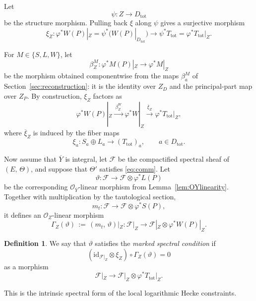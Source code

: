 \documentclass[a4paper,12pt]{amsart}
\numberwithin{equation}{section}
\theoremstyle{definition}
\newtheorem{definition}[theorem]{Definition}
\newcommand{\OO}{\mathcal{O}}
\newcommand{\cF}{\mathcal{F}}
\newcommand{\id}{\mathrm{id}}
\begin{document}
Let
\[
\psi:Z\longrightarrow D_{\mathrm{tot}}
\]
be the structure morphism.  Pulling back \(\xi\) along \(\psi\) gives a surjective morphism
\begin{equation}\label{eq:xiZ}
\xi_Z:\varphi^*W(P)|_Z=\psi^*\bigl(W(P)|_{D_{\mathrm{tot}}}\bigr)
\longrightarrow
\psi^*T_{\mathrm{tot}}=\varphi^*T_{\mathrm{tot}}|_Z .
\end{equation}

For \(M\in\{S,L,W\}\), let
\[
\beta_Z^M:\varphi^*M(P)|_Z\longrightarrow \varphi^*M|_Z
\]
be the morphism obtained componentwise from the maps \(\beta_a^M\) of Section~\ref{sec:reconstruction}: it is the identity over \(Z_D\) and the principal-part map over \(Z_P\).  By construction, \(\xi_Z\) factors as
\begin{equation}\label{eq:xiZ-factor}
\varphi^*W(P)|_Z
\xrightarrow{\ \beta_Z^W\ }
\varphi^*W|_Z
\xrightarrow{\ \overline{\xi}_Z\ }
\varphi^*T_{\mathrm{tot}}|_Z,
\end{equation}
where \(\overline{\xi}_Z\) is induced by the fiber maps
\[
\xi_a:S_a\oplus L_a\longrightarrow (T_{\mathrm{tot}})_a,
\qquad a\in D_{\mathrm{tot}}.
\]

Now assume that \(\overline{Y}\) is integral, let \(\cF\) be the compactified spectral sheaf of \((E,\,\Theta)\), and suppose that \(\Theta'\) satisfies \eqref{eq:comm}.  Let
\[
\vartheta:\cF\longrightarrow \cF\otimes \varphi^*L(P)
\]
be the corresponding \(\OO_{\overline{Y}}\)-linear morphism from Lemma~\ref{lem:OYlinearity}.  Together with multiplication by the tautological section,
\[
m_t:\cF\longrightarrow \cF\otimes \varphi^*S(P),
\]
it defines an \(\OO_Z\)-linear morphism
\begin{equation}\label{eq:GammaZ}
\Gamma_Z(\vartheta)\,:=\,(m_t,\,\vartheta)|_Z:
\cF|_Z\longrightarrow \cF|_Z\otimes \varphi^*W(P)|_Z.
\end{equation}

\begin{definition}\label{def:intrinsic-marked-admissibility}
We say that \(\vartheta\) satisfies the \emph{marked spectral condition} if
\begin{equation}\label{eq:intrinsic-marked-condition}
(\id_{\cF|_Z}\otimes \xi_Z)\circ \Gamma_Z(\vartheta)=0
\end{equation}
as a morphism
\[
\cF|_Z\longrightarrow \cF|_Z\otimes \varphi^*T_{\mathrm{tot}}|_Z.
\]
\end{definition}

This is the intrinsic spectral form of the local logarithmic Hecke constraints.
\end{document}
